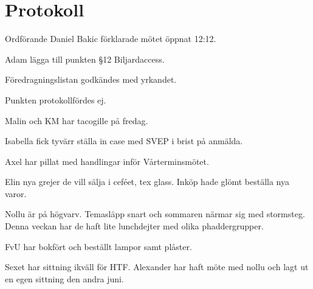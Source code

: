 \documentclass[10pt]{article}
\def\mo{Daniel Bakic}
\begin{document}
\section*{Protokoll}
\begin{paragrafer}
	Ordförande {\mo} förklarade mötet öppnat 12:12.

	{\valavmo}

	{\valavms}

	{\valavj}

	{\tosg}

	{\ingaadj}


	Adam \ypa lägga till punkten \S12 Biljardaccess.

	Föredragningslistan godkändes med yrkandet.


	\begin{fyllnadsval} %
	\end{fyllnadsval}

	\begin{paragrafer}
		Punkten protokollfördes ej.


		Malin och KM har tacogille på fredag.

		Isabella fick tyvärr ställa in case med SVEP i brist på anmälda.

		Axel har pillat med handlingar inför Vårterminsmötet.

		Elin nya grejer de vill sälja i ceféet, tex glass. Inköp hade glömt beställa nya varor.

		Nollu är på högvarv. Temasläpp snart och sommaren närmar sig med stormsteg. Denna veckan har de haft lite lunchdejter med olika phaddergrupper.

		FvU har bokfört och beställt lampor samt plåster.

		Sexet har sittning ikväll för HTF. Alexander har haft möte med nollu och lagt ut en egen sittning den andra juni.


\end{paragrafer}
\end{paragrafer}
\end{document}
